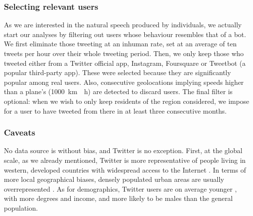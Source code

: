 \documentclass[../thesis.tex]{subfiles}
\begin{document}
\subsubsection{Selecting relevant users}
\label{sec:method_users_select}
As we are interested in the natural speech produced by individuals, we actually start
our analyses by filtering out users whose behaviour resembles that of a bot. We first
eliminate those tweeting at an inhuman rate, set at an average of ten tweets per hour
over their whole tweeting period. Then, we only keep those who tweeted either from a
Twitter official app, Instagram, Foursquare or Tweetbot (a popular third-party app).
These were selected because they are significantly popular among real users. Also,
consecutive geolocations implying speeds higher than a plane's (\SI{1000}{\kilo \meter
\per \hour}) are detected to discard users. The final filter is optional: when we wish
to only keep residents of the region considered, we impose for a user to have tweeted
from there in at least three consecutive months.


\subsubsection{Caveats}
No data source is without bias, and Twitter is no exception. First, at the global scale,
as we already mentioned, Twitter is more representative of people living in western,
developed countries with widespread access to the Internet
\cite{HawelkaGeolocatedTwitter2014,MocanuTwitterBabel2013}. In terms of more local
geographical biases, densely populated urban areas are usually overrepresented
\cite{MisloveUnderstandingDemographics2011,JiangUnderstandingDemographic2019,AuxierSocialMedia2021}.
As for demographics, Twitter users are on average younger
\cite{NguyenHowOld2013,AuxierSocialMedia2021,SloanWhoTweets2017}, with more degrees and
income, and more likely to be males
\cite{MisloveUnderstandingDemographics2011,AuxierSocialMedia2021,SloanWhoTweets2017} than the general population.
\end{document}
